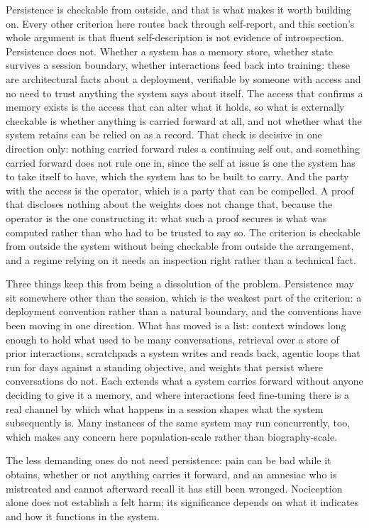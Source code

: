 Persistence is checkable from outside, and that is what makes it worth building on. Every other criterion here routes back through self-report, and this section's whole argument is that fluent self-description is not evidence of introspection. Persistence does not. Whether a system has a memory store, whether state survives a session boundary, whether interactions feed back into training: these are architectural facts about a deployment, verifiable by someone with access and no need to trust anything the system says about itself. The access that confirms a memory exists is the access that can alter what it holds, so what is externally checkable is whether anything is carried forward at all, and not whether what the system retains can be relied on as a record. That check is decisive in one direction only: nothing carried forward rules a continuing self out, and something carried forward does not rule one in, since the self at issue is one the system has to take itself to have, which the system has to be built to carry. And the party with the access is the operator, which is a party that can be compelled. A proof that discloses nothing about the weights does not change that, because the operator is the one constructing it: what such a proof secures is what was computed rather than who had to be trusted to say so. The criterion is checkable from outside the system without being checkable from outside the arrangement, and a regime relying on it needs an inspection right rather than a technical fact.

Three things keep this from being a dissolution of the problem. Persistence may sit somewhere other than the session, which is the weakest part of the criterion: a deployment convention rather than a natural boundary, and the conventions have been moving in one direction. What has moved is a list: context windows long enough to hold what used to be many conversations, retrieval over a store of prior interactions, scratchpads a system writes and reads back, agentic loops that run for days against a standing objective, and weights that persist where conversations do not. Each extends what a system carries forward without anyone deciding to give it a memory, and where interactions feed fine-tuning there is a real channel by which what happens in a session shapes what the system subsequently is. Many instances of the same system may run concurrently, too, which makes any concern here population-scale rather than biography-scale.

The less demanding ones do not need persistence: pain can be bad while it obtains, whether or not anything carries it forward, and an amnesiac who is mistreated and cannot afterward recall it has still been wronged. Nociception alone does not establish a felt harm; its significance depends on what it indicates and how it functions in the system.

